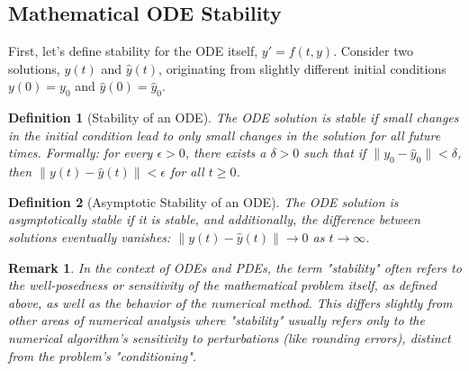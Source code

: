 \documentclass{article}
\newtheorem{definition}{Definition}
\newtheorem{remark}{Remark}
\begin{document}
\subsection{Mathematical ODE Stability}
First, let's define stability for the ODE itself, $y' = f(t, y)$. Consider two solutions, $y(t)$ and $\hat{y}(t)$, originating from slightly different initial conditions $y(0) = y_0$ and $\hat{y}(0) = \hat{y}_0$.

\begin{definition}[Stability of an ODE]
The ODE solution is stable if small changes in the initial condition lead to only small changes in the solution for all future times. Formally: for every $\epsilon > 0$, there exists a $\delta > 0$ such that if $\|y_0 - \hat{y}_0\| < \delta$, then $\|y(t) - \hat{y}(t)\| < \epsilon$ for all $t \ge 0$.
\end{definition}

\begin{definition}[Asymptotic Stability of an ODE]
The ODE solution is asymptotically stable if it is stable, and additionally, the difference between solutions eventually vanishes: $\|y(t) - \hat{y}(t)\| \to 0$ as $t \to \infty$.
\end{definition}

\begin{remark}
In the context of ODEs and PDEs, the term "stability" often refers to the well-posedness or sensitivity of the mathematical problem itself, as defined above, as well as the behavior of the numerical method. This differs slightly from other areas of numerical analysis where "stability" usually refers only to the numerical algorithm's sensitivity to perturbations (like rounding errors), distinct from the problem's "conditioning".
\end{remark}
\end{document}

